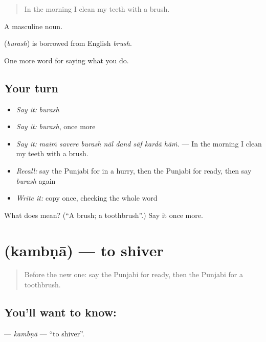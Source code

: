 \begin{quote}
In the morning I clean my teeth with a brush.
\end{quote}

A masculine noun.

\begin{cousinweb}
\textbf{} (\emph{burash}) is borrowed from English \emph{brush}.
\end{cousinweb}

\begin{grammarlens}[title={What you've built}]
One more word for saying what you do.
\end{grammarlens}

\subsection*{Your turn}
\begin{itemize}
\raggedright
  \item \emph{Say it:} \emph{burash}
  \item \emph{Say it:} \emph{burash}, once more
  \item \emph{Say it:} \emph{maiṁ savere burash nāl dand sāf kardā hāṁ.} — In the morning I clean my teeth with a brush.
  \item \emph{Recall:} say the Punjabi for in a hurry, then the Punjabi for ready, then say \emph{burash} again
  \item \emph{Write it:} copy \textbf{} once, checking the whole word
\end{itemize}

\begin{tcolorbox}[breakable,colback=teal!4,colframe=teal!35!black,title={Before you move on}]
What does  mean? (\textquotedblleft{}A brush; a toothbrush\textquotedblright{}.) Say it once more.
\end{tcolorbox}
\section[\texorpdfstring{\pa{ਕੰਬਣਾ} (kambṇā)}{ਕੰਬਣਾ (kambṇā)}]{ (kambṇā) — to shiver}

\label{lesson:PA-C226-kambna}



\begin{quote}
Before the new one: say the Punjabi for ready, then the Punjabi for a toothbrush.
\end{quote}

\subsection*{You'll want to know: }
\textbf{} — \emph{kambṇā} — \textquotedblleft{}to shiver\textquotedblright{}.

